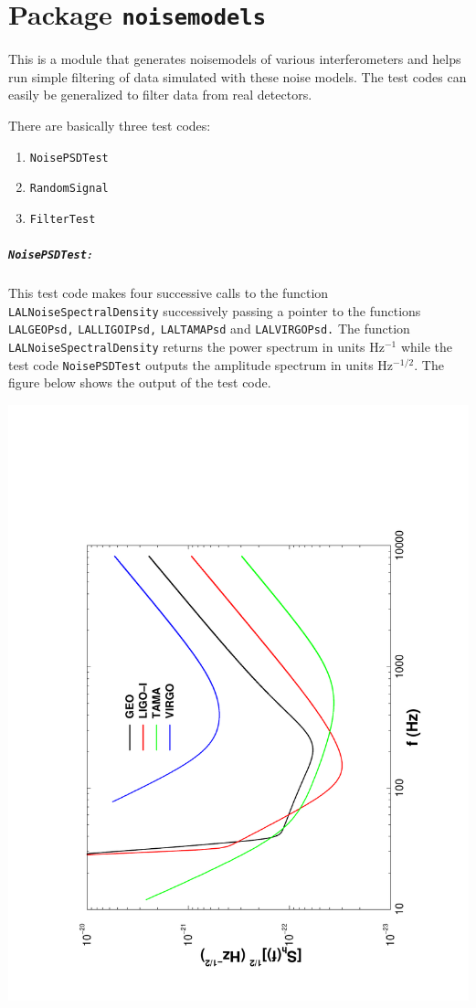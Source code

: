 \chapter{Package \texttt{noisemodels}}

This is a module that generates noisemodels of various interferometers
and helps run simple filtering of data simulated with these noise models.
The test codes can easily be generalized to filter data from real
detectors.

There are basically three test codes:
\begin{enumerate} 
\item \texttt{NoisePSDTest}
\item \texttt{RandomSignal}
\item \texttt{FilterTest}
\end{enumerate} 

\paragraph* {\texttt{NoisePSDTest}:} This test code makes four
successive calls to the function \texttt{LALNoiseSpectralDensity}
successively passing a pointer to the functions \texttt{LALGEOPsd,} 
\texttt{LALLIGOIPsd,} \texttt{LALTAMAPsd} and \texttt {LALVIRGOPsd.}  
The function \texttt{LALNoiseSpectralDensity} returns the power
spectrum in units Hz$^{-1}$ while the test code \texttt{NoisePSDTest}
outputs the amplitude spectrum in units Hz$^{-1/2}.$ The figure
below shows the output of the test  code.
\begin{center}
\includegraphics[angle=-90,width=4truein]{NoisePSDTest.pdf}
\end{center}
 
